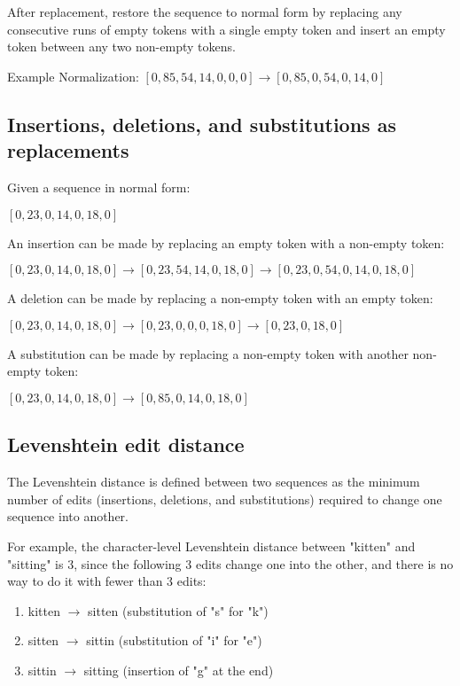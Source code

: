 \documentclass{article}
\begin{document}
After replacement, restore the sequence to normal form by replacing any consecutive runs of empty tokens with a single empty token and insert an empty token between any two non-empty tokens.

\vspace*{1em}
\noindent Example Normalization: $[0, 85, 54, 14, 0, 0, 0] \rightarrow [0, 85, 0, 54, 0, 14, 0]$
\vspace*{1em}

\subsection{Insertions, deletions, and substitutions as replacements}
Given a sequence in normal form:

$[0, 23, 0, 14, 0, 18, 0]$

\vspace{1em}
\noindent An insertion can be made by replacing an empty token with a non-empty token:

$[0, 23, 0, 14, 0, 18, 0] \rightarrow [0, 23, 54, 14, 0, 18, 0] \rightarrow [0, 23, 0, 54, 0, 14, 0, 18, 0]$

\vspace{1em}
\noindent A deletion can be made by replacing a non-empty token with an empty token:

$[0, 23, 0, 14, 0, 18, 0] \rightarrow [0, 23, 0, 0, 0, 18, 0] \rightarrow [0, 23, 0, 18, 0]$

\vspace{1em}
\noindent A substitution can be made by replacing a non-empty token with another non-empty token:

$[0, 23, 0, 14, 0, 18, 0] \rightarrow [0, 85, 0, 14, 0, 18, 0]$

\subsection{Levenshtein edit distance}
The Levenshtein distance is defined between two sequences as the minimum number of edits (insertions, deletions, and substitutions) required to change one sequence into another.

For example, the character-level Levenshtein distance between "kitten" and "sitting" is 3, since the following 3 edits change one into the other, and there is no way to do it with fewer than 3 edits:
\begin{enumerate}
    \item{kitten $\rightarrow$ sitten (substitution of "s" for "k")}
    \item{sitten $\rightarrow$ sittin (substitution of "i" for "e")}
    \item{sittin $\rightarrow$ sitting (insertion of "g" at the end)}
\end{enumerate}
\end{document}
